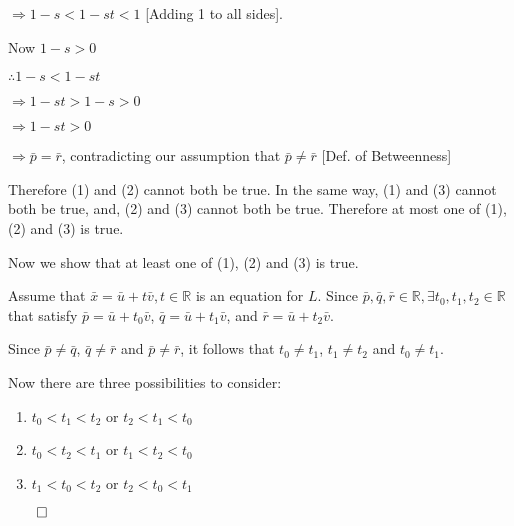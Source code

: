 \begin{proofbox}
  \quad $\Rightarrow 1-s < 1-st < 1$ \hfill [Adding 1 to all sides].

  Now $1-s>0$

  $\therefore 1-s < 1-st$

  \quad $\Rightarrow 1-st > 1-s > 0$

  \quad $\Rightarrow 1-st > 0$

  \quad $\Rightarrow \bar{p} = \bar{r}$, contradicting our assumption that $\bar{p} \neq \bar{r}$ \hfill [Def. of Betweenness]

  Therefore (1) and (2) cannot both be true. In the same way, (1) and (3) cannot both be true, and, (2) and (3) cannot both be true. 
  Therefore at most one of (1), (2) and (3) is true.

  \vspace{1em}

  Now we show that at least one of (1), (2) and (3) is true.

  Assume that $\bar{x} = \bar{u} + t\bar{v}, t \in \mathbb{R}$ is an equation for $L$. Since $\bar{p}, \bar{q}, \bar{r} \in \mathbb{R}, \exists t_0, t_1, t_2 \in \mathbb{R}$ that satisfy $\bar{p}=\bar{u} +t_0\bar{v}$, $\bar{q}=\bar{u} +t_1\bar{v}$, and $\bar{r}=\bar{u} +t_2\bar{v}$.

  Since $\bar{p} \neq \bar{q}$, $\bar{q} \neq \bar{r}$ and $\bar{p} \neq \bar{r}$, it follows that $t_0 \neq t_1$, $t_1 \neq t_2$ and $t_0 \neq t_1$.

  Now there are three possibilities to consider:

  \begin{enumerate}
    \renewcommand{\labelenumi}{(\roman{enumi})}
    \item $t_0 < t_1 < t_2$ or $t_2 < t_1 < t_0$
    \item $t_0 < t_2 < t_1$ or $t_1 < t_2 < t_0$
    \item $t_1 < t_0 < t_2$ or $t_2 < t_0 < t_1$
  \end{enumerate}
  \hfill $\qed$
\end{proofbox}


